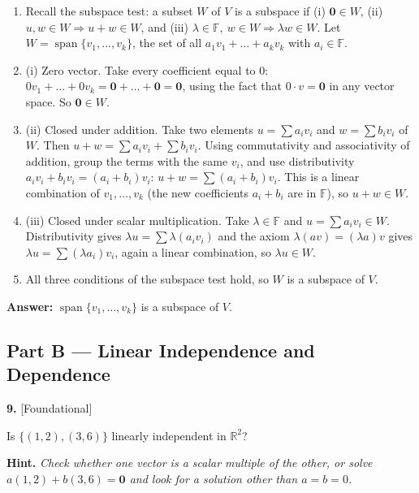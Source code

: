 \documentclass[11pt]{article}
\begin{document}
\begin{tcolorbox}[breakable,colback=ans,colframe=ansb,boxrule=0.5pt,left=4pt,right=4pt,top=2pt,bottom=2pt]\begin{enumerate}[leftmargin=2.2em,itemsep=1pt,topsep=1pt,label=\textbf{Step \arabic*.}]\item Recall the subspace test: a subset $W$ of $V$ is a subspace if (i) $\mathbf 0\in W$, (ii) $u,w\in W\Rightarrow u+w\in W$, and (iii) $\lambda\in\mathbb{F},\ w\in W\Rightarrow\lambda w\in W$. Let $W=\operatorname{span}\{v_1,\dots,v_k\}$, the set of all $a_1v_1+\dots+a_kv_k$ with $a_i\in\mathbb{F}$.
\item (i) Zero vector. Take every coefficient equal to $0$: $0v_1+\dots+0v_k=\mathbf 0+\dots+\mathbf 0=\mathbf 0$, using the fact that $0\cdot v=\mathbf 0$ in any vector space. So $\mathbf 0\in W$.
\item (ii) Closed under addition. Take two elements $u=\sum a_iv_i$ and $w=\sum b_iv_i$ of $W$. Then $u+w=\sum a_iv_i+\sum b_iv_i$. Using commutativity and associativity of addition, group the terms with the same $v_i$, and use distributivity $a_iv_i+b_iv_i=(a_i+b_i)v_i$: $u+w=\sum(a_i+b_i)v_i$. This is a linear combination of $v_1,\dots,v_k$ (the new coefficients $a_i+b_i$ are in $\mathbb{F}$), so $u+w\in W$.
\item (iii) Closed under scalar multiplication. Take $\lambda\in\mathbb{F}$ and $u=\sum a_iv_i\in W$. Distributivity gives $\lambda u=\sum\lambda(a_iv_i)$ and the axiom $\lambda(av)=(\lambda a)v$ gives $\lambda u=\sum(\lambda a_i)v_i$, again a linear combination, so $\lambda u\in W$.
\item All three conditions of the subspace test hold, so $W$ is a subspace of $V$.
\end{enumerate}\textbf{Answer:} $\operatorname{span}\{v_1,\dots,v_k\}$ is a subspace of $V$.\end{tcolorbox}
\par\vspace{2pt}
\subsection*{\normalsize\color{ink} Part B --- Linear Independence and Dependence}
\begin{minipage}{\linewidth}\textbf{9.} \hfill{\scriptsize\color{ink}[Foundational]}\par\nopagebreak Is $\{(1,2),(3,6)\}$ linearly independent in $\mathbb{R}^{2}$?
\par\smallskip\begingroup\small\color{ink}\textbf{Hint.} \textit{Check whether one vector is a scalar multiple of the other, or solve $a(1,2)+b(3,6)=\mathbf 0$ and look for a solution other than $a=b=0$.}\endgroup
\end{minipage}\par\nopagebreak
\end{document}
